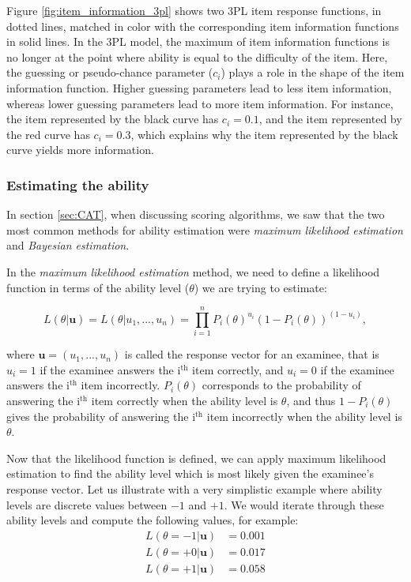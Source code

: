 Figure \ref{fig:item_information_3pl} shows two 3PL item response functions, in dotted lines, matched in color with the corresponding item information functions in solid lines. In the 3PL model, the maximum of item information functions is no longer at the point where ability is equal to the difficulty of the item. Here, the guessing or pseudo-chance parameter ($c_i$) plays a role in the shape of the item information function. Higher guessing parameters lead to less item information, whereas lower guessing parameters lead to more item information. For instance, the item represented by the black curve has $c_i=0.1$, and the item represented by the red curve has $c_i=0.3$, which explains why the item represented by the black curve yields more information.

\subsubsection{Estimating the ability}
In section \ref{sec:CAT}, when discussing scoring algorithms, we saw that the two most common methods for ability estimation were \textit{maximum likelihood estimation} and \textit{Bayesian estimation}.\newline

In the \textit{maximum likelihood estimation} method, we need to define a likelihood function in terms of the ability level ($\theta$) we are trying to estimate:

\begin{equation*}
L(\theta | \textbf{u}) = L(\theta | u_1, ..., u_n) = \prod_{i=1}^n P_i(\theta)^{u_i}(1 - P_i(\theta))^{(1 - u_i)} ,
\end{equation*}

where $\textbf{u}=(u_1, ..., u_n)$ is called the response vector for an examinee, that is $u_i=1$ if the examinee answers the i$^\text{th}$ item correctly, and $u_i=0$ if the examinee answers the i$^\text{th}$ item incorrectly. $P_i(\theta)$ corresponds to the probability of answering the i$^\text{th}$ item correctly when the ability level is $\theta$, and thus $1 - P_i(\theta)$ gives the probability of answering the i$^\text{th}$ item incorrectly when the ability level is $\theta$. \newline

Now that the likelihood function is defined, we can apply maximum likelihood estimation to find the ability level which is most likely given the examinee's response vector. Let us illustrate with a very simplistic example where ability levels are discrete values between $-1$ and $+1$. We would iterate through these ability levels and compute the following values, for example:
\begin{align*}
L(\theta=-1 | \textbf{u}) &= 0.001 \\
L(\theta=+0 | \textbf{u}) &= 0.017 \\
L(\theta=+1 | \textbf{u}) &= 0.058
\end{align*}

